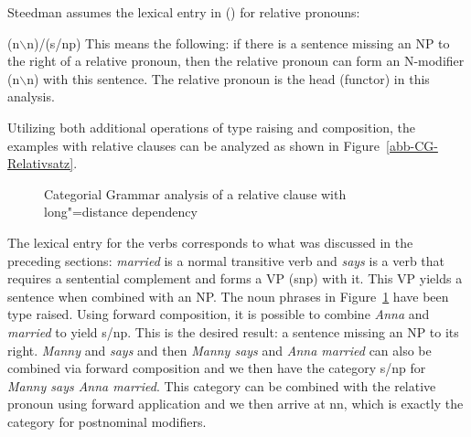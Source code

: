 Steedman assumes the lexical entry in () for relative pronouns:

\ea
\label{le-Relativpronomen-CG}
(n$\backslash$n)/(s/np)
\z
This means the following: if there is a sentence missing an NP to the right of a relative pronoun, then the relative pronoun can form an
N-modifier (n$\backslash$n) with this sentence. The relative pronoun is the head (functor) in this analysis.

Utilizing both additional operations of type raising and composition, the examples with relative clauses can be analyzed as shown in
Figure~\vref{abb-CG-Relativsatz}.
%
\begin{figure}
\centerline{%
}
\caption{\label{abb-CG-Relativsatz}Categorial Grammar analysis of a relative clause with long"=distance dependency}
\end{figure}%
%
The lexical entry for the verbs corresponds to what was discussed in the preceding sections: \emph{married} is a normal transitive verb and 
 \emph{says} is a verb that requires a sentential complement and forms a VP (s\bs np) with it. This VP yields a sentence when combined
 with an NP. The noun phrases in Figure~\ref{abb-CG-Relativsatz} have been type raised. Using forward composition, it is possible to combine 
 \emph{Anna} and \emph{married} to yield s/np. This is the desired result: a sentence missing an NP to its right. \emph{Manny}
and \emph{says} and then \emph{Manny says} and \emph{Anna married} can also be combined via forward composition and we then have the category
s/np for \emph{Manny says Anna married}. This category can be combined with the relative pronoun using forward application and we then arrive at
n\bs n, which is exactly the category for postnominal modifiers.

